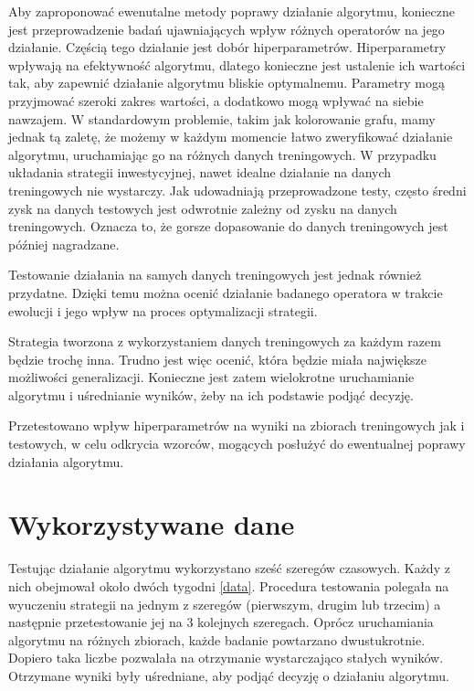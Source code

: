 \documentclass[twoside]{iisthesis}
\begin{document}
Aby zaproponować ewenutalne metody poprawy działanie algorytmu, konieczne jest przeprowadzenie badań ujawniających wpływ różnych operatorów na jego działanie. Częścią tego działanie jest dobór hiperparametrów. Hiperparametry wpływają na efektywność algorytmu, dlatego konieczne jest ustalenie ich wartości tak, aby zapewnić działanie algorytmu bliskie optymalnemu. Parametry mogą przyjmować szeroki zakres wartości, a dodatkowo mogą wpływać na siebie nawzajem. W standardowym problemie, takim jak kolorowanie grafu, mamy jednak tą zaletę, że możemy w każdym momencie łatwo zweryfikować działanie algorytmu, uruchamiając go na różnych danych treningowych. W przypadku układania strategii inwestycyjnej, nawet idealne działanie na danych treningowych nie wystarczy. Jak udowadniają przeprowadzone testy, często średni zysk na danych testowych jest odwrotnie zależny od zysku na danych treningowych. Oznacza to, że gorsze dopasowanie do danych treningowych jest później nagradzane. 

Testowanie działania na samych danych treningowych jest jednak również przydatne. Dzięki temu można ocenić działanie badanego operatora w trakcie ewolucji i jego wpływ na proces optymalizacji strategii.

Strategia tworzona z wykorzystaniem danych treningowych za każdym razem będzie trochę inna. Trudno jest więc ocenić, która będzie miała największe możliwości generalizacji. Konieczne jest zatem wielokrotne uruchamianie algorytmu i uśrednianie wyników, żeby na ich podstawie podjąć decyzję.

Przetestowano wpływ hiperparametrów na wyniki na zbiorach treningowych jak i testowych, w celu odkrycia wzorców, mogących posłużyć do ewentualnej poprawy działania algorytmu.

\section {Wykorzystywane dane}

Testując działanie algorytmu wykorzystano sześć szeregów czasowych. Każdy z nich obejmował około dwóch tygodni \ref{data}.
Procedura testowania polegała na wyuczeniu strategii na jednym z szeregów (pierwszym, drugim lub trzecim) a następnie przetestowanie jej na 3 kolejnych szeregach. Oprócz uruchamiania algorytmu na różnych zbiorach, każde badanie powtarzano dwustukrotnie. Dopiero taka liczbe pozwalała na otrzymanie wystarczająco stałych wyników. Otrzymane wyniki były uśredniane, aby podjąć decyzję o działaniu algorytmu. 
\end{document}
